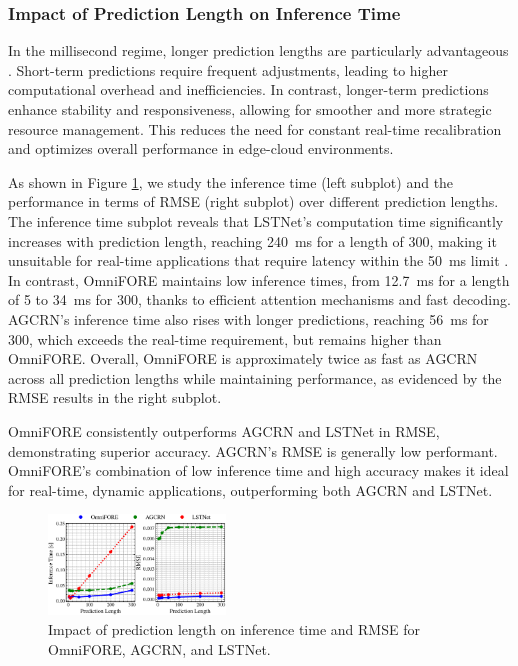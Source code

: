 \documentclass{ieeetmlcn}
\begin{document}
\subsubsection{\textbf{Impact of Prediction Length on Inference Time}}

In the millisecond regime, longer prediction lengths are particularly advantageous \cite{9500858}. Short-term predictions require frequent adjustments, leading to higher computational overhead and inefficiencies. In contrast, longer-term predictions enhance stability and responsiveness, allowing for smoother and more strategic resource management. This reduces the need for constant real-time recalibration and optimizes overall performance in edge-cloud environments.

As shown in Figure \ref{fig:pred_vs_inf}, we study the inference time (left subplot) and the performance in terms of RMSE (right subplot) over different prediction lengths. The inference time subplot reveals that LSTNet's computation time significantly increases with prediction length, reaching \SI{240}{\milli\second} for a length of 300, making it unsuitable for real-time applications that require latency within the \SI{50}{\milli\second} limit \cite{8334540}. In contrast, OmniFORE maintains low inference times, from \SI{12.7}{\milli\second} for a length of 5 to \SI{34}{\milli\second} for 300, thanks to efficient attention mechanisms and fast decoding. AGCRN's inference time also rises with longer predictions, reaching \SI{56}{\milli\second} for 300, which exceeds the real-time requirement, but remains higher than OmniFORE. Overall, OmniFORE is approximately twice as fast as AGCRN across all prediction lengths while maintaining performance, as evidenced by the RMSE results in the right subplot.

OmniFORE consistently outperforms AGCRN and LSTNet in RMSE, demonstrating superior accuracy. AGCRN's RMSE is generally low performant. OmniFORE's combination of low inference time and high accuracy makes it ideal for real-time, dynamic applications, outperforming both AGCRN and LSTNet.

\begin{figure}%
\centering
\includegraphics[width=0.42\textwidth]{img/pred_vs_inf.eps}
\caption{Impact of prediction length on inference time and RMSE for OmniFORE, AGCRN, and LSTNet.}
\label{fig:pred_vs_inf}
\end{figure}
\end{document}
